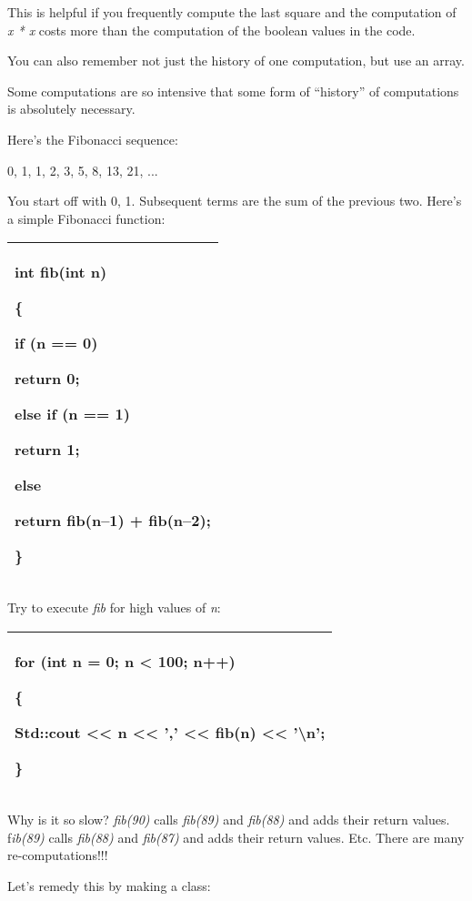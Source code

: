 \documentclass[
]{article}
\begin{document}
This is helpful if you frequently compute the last square and the
computation of \emph{x * x} costs more than the computation of the
boolean values in the code.

You can also remember not just the history of one computation, but use
an array.

Some computations are so intensive that some form of ``history'' of
computations is absolutely necessary.

Here's the Fibonacci sequence:

0, 1, 1, 2, 3, 5, 8, 13, 21, ...

You start off with 0, 1. Subsequent terms are the sum of the previous
two. Here's a simple Fibonacci function:

\begin{longtable}[]{@{}l@{}}
\toprule
\endhead
\begin{minipage}[t]{0.97\columnwidth}\raggedright
int fib(int n)

\{

if (n == 0)

return 0;

else if (n == 1)

return 1;

else

return fib(n--1) + fib(n--2);

\}\strut
\end{minipage}\tabularnewline
\bottomrule
\end{longtable}

Try to execute \emph{fib} for high values of \emph{n}:

\begin{longtable}[]{@{}l@{}}
\toprule
\endhead
\begin{minipage}[t]{0.97\columnwidth}\raggedright
for (int n = 0; n \textless{} 100; n++)

\{

Std::cout \textless\textless{} n \textless\textless{} ','
\textless\textless{} fib(n) \textless\textless{} '\textbackslash n';

\}\strut
\end{minipage}\tabularnewline
\bottomrule
\end{longtable}

Why is it so slow? \emph{fib(90)} calls \emph{fib(89)} and
\emph{fib(88)} and adds their return values. f\emph{ib(89) }calls
\emph{fib(88)} and \emph{fib(87)} and adds their return values. Etc.
There are many re-computations!!!

Let's remedy this by making a class:
\end{document}
